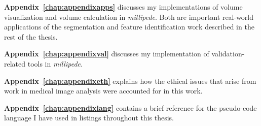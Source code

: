 \textbf{Appendix~\ref{chap:appendixapps}} discusses my implementations of volume visualization and volume calculation in \emph{millipede}. Both are important real-world applications of the segmentation and feature identification work described in the rest of the thesis.

\textbf{Appendix~\ref{chap:appendixval}} discusses my implementation of validation-related tools in \emph{millipede}.

\textbf{Appendix~\ref{chap:appendixeth}} explains how the ethical issues that arise from work in medical image analysis were accounted for in this work.

\textbf{Appendix~\ref{chap:appendixlang}} contains a brief reference for the pseudo-code language I have used in listings throughout this thesis.
